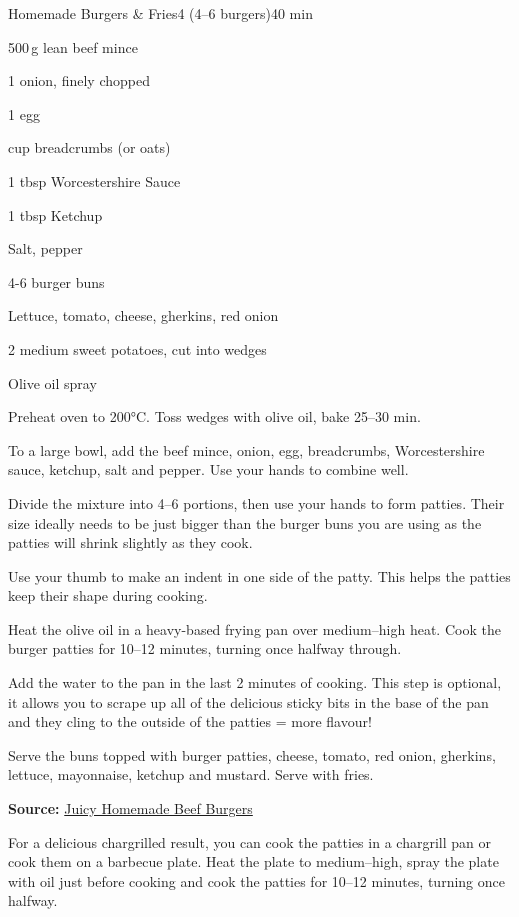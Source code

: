 \begin{recipebox}{Homemade Burgers \& Fries}{4 (4--6 burgers)}{40 min}
\begin{ingredients}
  \item 500\,g lean beef mince
  \item 1 onion, finely chopped
  \item 1 egg
  \item {} cup breadcrumbs (or oats)
  \item 1 tbsp Worcestershire Sauce
  \item 1 tbsp Ketchup
  \item Salt, pepper
  \item 4-6 burger buns
  \item Lettuce, tomato, cheese, gherkins, red onion
  \item 2 medium sweet potatoes, cut into wedges
  \item Olive oil spray
\end{ingredients}

\begin{method}
  \item Preheat oven to 200°C. Toss wedges with olive oil, bake 25–30 min.
  \item To a large bowl, add the beef mince, onion, egg, breadcrumbs, Worcestershire sauce, ketchup, salt and pepper. Use your hands to combine well.
  \item Divide the mixture into 4–6 portions, then use your hands to form patties. Their size ideally needs to be just bigger than the burger buns you are using as the patties will shrink slightly as they cook.
  \item Use your thumb to make an indent in one side of the patty. This helps the patties keep their shape during cooking.
  \item Heat the olive oil in a heavy-based frying pan over medium–high heat. Cook the burger patties for 10–12 minutes, turning once halfway through. 
  \item Add the water to the pan in the last 2 minutes of cooking. This step is optional, it allows you to scrape up all of the delicious sticky bits in the base of the pan and they cling to the outside of the patties = more flavour! 
  \item Serve the buns topped with burger patties, cheese, tomato, red onion, gherkins, lettuce, mayonnaise, ketchup and mustard. Serve with fries.
\end{method}
\textbf{Source:} \href{https://simplehomeedit.com/recipe/homemade-beef-burger/}{Juicy Homemade Beef Burgers}

\begin{notes}
For a delicious chargrilled result, you can cook the patties in a chargrill pan or cook them on a barbecue plate. Heat the plate to medium–high, spray the plate with oil just before cooking and cook the patties for 10–12 minutes, turning once halfway.
\end{notes}

\end{recipebox}
